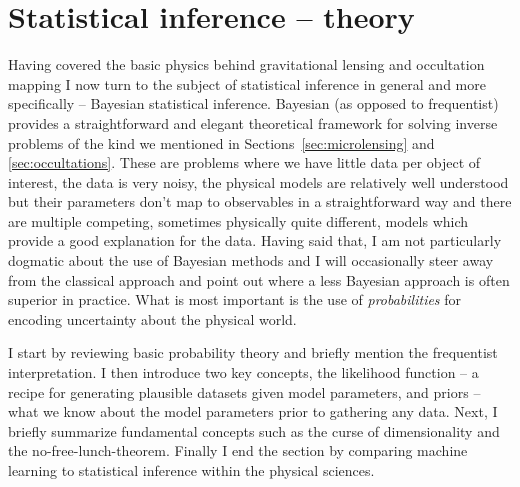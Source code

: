 \documentclass[12pt]{report}
\begin{document}
\section{Statistical inference -- theory}
\label{sec:inference_theory}
Having covered the basic physics behind gravitational lensing and occultation mapping I
now turn to the subject of statistical inference in general and more specifically --
Bayesian statistical inference. Bayesian (as opposed to frequentist)
provides a straightforward and elegant theoretical framework for solving inverse
problems of the kind we mentioned
in Sections~\ref{sec:microlensing}  and \ref{sec:occultations}. These are problems
where we have little data per object of interest, the data is very noisy,
the physical models are relatively well understood but their parameters don't map
to observables in a straightforward way and there are multiple competing, sometimes
physically  quite different, models which provide a good explanation for the data.
Having said that, I am not particularly dogmatic about the use of Bayesian methods
and I will occasionally steer away from the classical approach and point out where
a less Bayesian approach is often superior in practice.  What is most important is the
use of \emph{probabilities} for encoding uncertainty about the physical world.

I start by reviewing basic probability theory and briefly mention the
frequentist interpretation. I then introduce two key concepts, the likelihood
function -- a recipe for generating plausible datasets given model parameters,
and priors -- what we know about the model parameters prior to gathering any
data. Next, I briefly summarize fundamental concepts such as the curse of
dimensionality and the no-free-lunch-theorem. Finally I end the section by
comparing machine learning to statistical inference within the physical
sciences.
\end{document}

